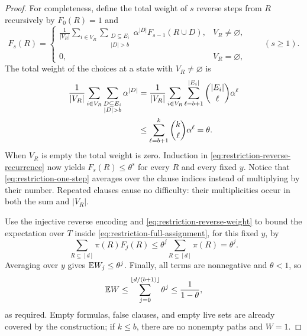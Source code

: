 \begin{proof}
For completeness, define the total weight of $s$ reverse steps from $R$
recursively by $F_0(R)=1$ and
\begin{equation}\label{eq:restriction-reverse-recurrence}
 F_s(R)=
 \begin{cases}
 \displaystyle\frac{1}{|V_R|}\sum_{i\in V_R}
         \sum_{\substack{D\subseteq E_i\\|D|>b}}
                 \alpha^{|D|}F_{s-1}(R\cup D),&V_R\ne\varnothing,\\[3mm]
 0,&V_R=\varnothing,
 \end{cases}
 \qquad(s\geq1).
\end{equation}
The total weight of the choices at a state with $V_R\ne\varnothing$ is
\begin{align}
 \frac{1}{|V_R|}\sum_{i\in V_R}
             \sum_{\substack{D\subseteq E_i\\|D|>b}}\alpha^{|D|}
   &=\frac{1}{|V_R|}\sum_{i\in V_R}
          \sum_{\ell=b+1}^{|E_i|}\binom{|E_i|}{\ell}\alpha^\ell
       \notag\\
   &\leq\sum_{\ell=b+1}^{k}\binom{k}{\ell}\alpha^\ell
     =\theta.\label{eq:restriction-one-step}
\end{align}
When $V_R$ is empty the total weight is zero.  Induction in
\eqref{eq:restriction-reverse-recurrence} now yields
$F_s(R)\leq\theta^s$ for every $R$ and every fixed $y$.  Notice that
\eqref{eq:restriction-one-step} averages over the clause indices instead
of multiplying by their number.  Repeated clauses cause no difficulty:
their multiplicities occur in both the sum and $|V_R|$.

Use the injective reverse encoding and
\eqref{eq:restriction-reverse-weight} to bound the expectation over $T$
inside \eqref{eq:restriction-full-assignment}, for this fixed $y$, by
\[
      \sum_{R\subseteq[d]}\pi(R)F_j(R)
        \leq\theta^j\sum_{R\subseteq[d]}\pi(R)=\theta^j.
\]
Averaging over $y$ gives $\mathbb E W_j\leq\theta^j$.  Finally, all terms are
nonnegative and $\theta<1$, so
\[
  \mathbb E W
       \leq\sum_{j=0}^{\left\lfloor d/(b+1)\right\rfloor}\theta^j
       \leq\frac{1}{1-\theta},
\]
as required.  Empty formulas, false clauses, and empty live sets are
already covered by the construction; if $k\leq b$, there are no nonempty
paths and $W=1$.
\end{proof}
